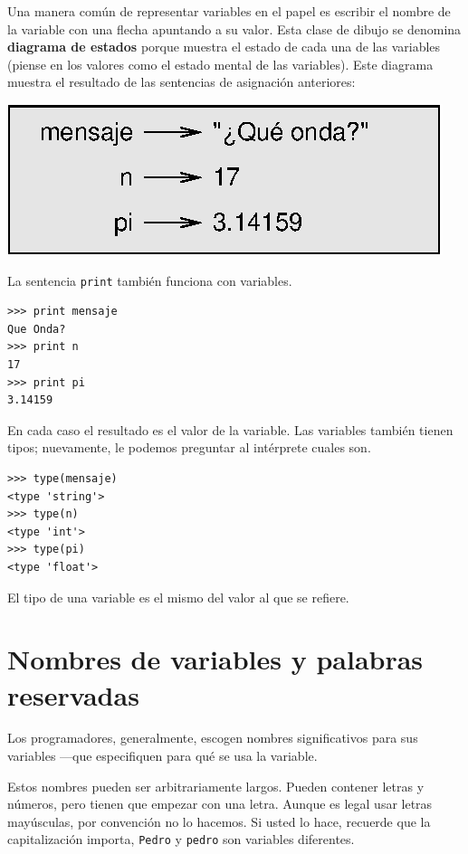 Una manera común de representar variables en el papel es escribir el nombre
de la variable con una flecha apuntando a su valor. Esta clase de dibujo se
denomina  {\bf diagrama de estados} porque muestra el estado de cada una de 
las variables (piense en los valores como el estado mental de las variables).
Este diagrama muestra el resultado de las sentencias de asignación anteriores:

\beforefig
\centerline{\includegraphics{illustrations/state2.eps}}
\afterfig

La sentencia \texttt{print} también funciona con variables.

\beforeverb
\begin{verbatim}
>>> print mensaje
Que Onda?
>>> print n
17
>>> print pi
3.14159
\end{verbatim}
\afterverb
%
En cada caso el resultado es el valor de la variable.
Las variables también tienen tipos; nuevamente, le podemos preguntar 
al intérprete cuales son.

\beforeverb
\begin{verbatim}
>>> type(mensaje)
<type 'string'>
>>> type(n)
<type 'int'>
>>> type(pi)
<type 'float'>
\end{verbatim}
\afterverb
%
El tipo de una variable es el mismo del valor al que se refiere.


\section{Nombres de variables y palabras reservadas}

Los programadores, generalmente, escogen nombres significativos para
sus variables ---que especifiquen para qué se usa la variable.

Estos nombres pueden ser arbitrariamente largos. Pueden contener
letras y números, pero tienen que empezar con una letra. Aunque 
es legal usar letras mayúsculas, por convención no lo hacemos. Si
usted lo hace, recuerde que la capitalización importa, \texttt{Pedro}
y \texttt{pedro} son variables diferentes.

